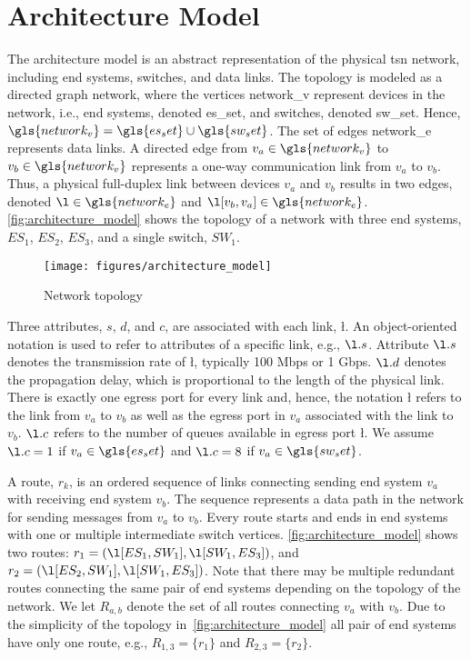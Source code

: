 \section{Architecture Model} \label{sec:architecture_model}
The architecture model is an abstract representation of the physical \gls{tsn} network, including end systems, switches, and data links.
The topology is modeled as a directed graph \gls{network}, where the vertices \gls{network_v} represent devices in the network, i.e., end systems, denoted \gls{es_set}, and switches, denoted \gls{sw_set}.
Hence, $\gls{network_v} = \gls{es_set} \cup \gls{sw_set}$.
The set of edges \gls{network_e} represents data links.
A directed edge from $v_a \in \gls{network_v}$ to $v_b \in \gls{network_v}$ represents a one-way communication link from $v_a$ to $v_b$.
Thus, a physical full-duplex link between devices $v_a$ and $v_b$ results in two edges, denoted $\l \in \gls{network_e}$ and $\l[v_b,v_a] \in \gls{network_e}$.
\autoref{fig:architecture_model} shows the topology of a network with three end systems, $ES_1$, $ES_2$, $ES_3$, and a single switch, $SW_1$.
\begin{figure}[b]
\centering
  \texttt{[image: figures/architecture\_model]}
\caption{Network topology}
 \label{fig:architecture_model}
\end{figure}

Three attributes, $s$, $d$, and $c$, are associated with each link, \l{}. An object-oriented notation is used to refer to attributes of a specific link, e.g., $\l.s$. Attribute $\l.s$ denotes the transmission rate of \l, typically 100 Mbps or 1 Gbps. $\l.d$ denotes the propagation delay, which is proportional to the length of the physical link.
There is exactly one egress port for every link and, hence, the notation \l{} refers to the link from $v_a$ to $v_b$ as well as the egress port in $v_a$ associated with the link to $v_b$. $\l.c$ refers to the number of queues available in egress port \l.
We assume $\l.c = 1$ if $v_a \in \gls{es_set}$ and $\l.c = 8$ if $v_a \in \gls{sw_set}$.

A route, $r_{k}$, is an ordered sequence of links connecting sending end system $v_a$ with receiving end system $v_b$.
The sequence represents a data path in the network for sending messages from $v_a$ to $v_b$.
Every route starts and ends in end systems with one or multiple intermediate switch vertices.
\autoref{fig:architecture_model} shows two routes: $r_{1} = (\l[ES_1, SW_1],\l[SW_1, ES_3])$, and $r_{2} = (\l[ES_2, SW_1],\l[SW_1, ES_3])$.
Note that there may be multiple redundant routes connecting the same pair of end systems depending on the topology of the network.
We let $R_{a,b}$ denote the set of all routes connecting $v_a$ with $v_b$.
Due to the simplicity of the topology in~\autoref{fig:architecture_model} all pair of end systems have only one route, e.g., $R_{1,3} = \{ r_1 \}$ and $R_{2,3} = \{ r_2 \}$.